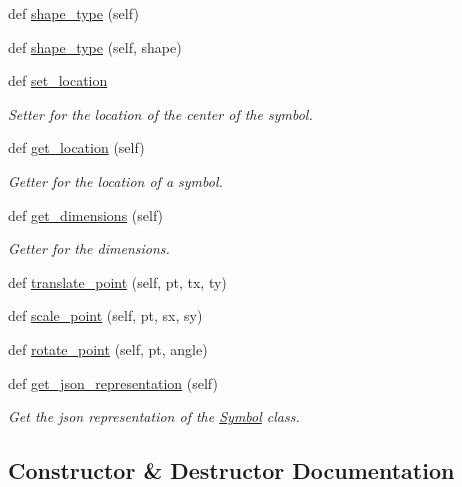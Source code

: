 \begin{DoxyCompactItemize}
def \hyperlink{classbridges_1_1symbol_1_1_symbol_a86813f0f1a7ecbe5c52725730c887e75}{shape\+\_\+type} (self)
\item 
def \hyperlink{classbridges_1_1symbol_1_1_symbol_aea966b54a55c137ec15e849829fc9be9}{shape\+\_\+type} (self, shape)
\item 
def \hyperlink{classbridges_1_1symbol_1_1_symbol_a616aeca9f529ed61300e92e63cbbaf99}{set\+\_\+location}
\begin{DoxyCompactList}\small\item\em Setter for the location of the center of the symbol. \end{DoxyCompactList}\item 
def \hyperlink{classbridges_1_1symbol_1_1_symbol_a8abbc9a5c77eb7e2ef40338102a145c4}{get\+\_\+location} (self)
\begin{DoxyCompactList}\small\item\em Getter for the location of a symbol. \end{DoxyCompactList}\item 
def \hyperlink{classbridges_1_1symbol_1_1_symbol_ae53057317f11148bbbf7c17c671cac2d}{get\+\_\+dimensions} (self)
\begin{DoxyCompactList}\small\item\em Getter for the dimensions. \end{DoxyCompactList}\item 
def \hyperlink{classbridges_1_1symbol_1_1_symbol_a9600a66f48ad38baf42a2043db13334b}{translate\+\_\+point} (self, pt, tx, ty)
\item 
def \hyperlink{classbridges_1_1symbol_1_1_symbol_a963b55370096aa7314b03a2a34da2929}{scale\+\_\+point} (self, pt, sx, sy)
\item 
def \hyperlink{classbridges_1_1symbol_1_1_symbol_a81d55230ba4fec6c9a31d76cfc97bc96}{rotate\+\_\+point} (self, pt, angle)
\item 
def \hyperlink{classbridges_1_1symbol_1_1_symbol_a746f8e6d1fd1c63c8a9140a2af7436f8}{get\+\_\+json\+\_\+representation} (self)
\begin{DoxyCompactList}\small\item\em Get the json representation of the \hyperlink{classbridges_1_1symbol_1_1_symbol}{Symbol} class. \end{DoxyCompactList}\end{DoxyCompactItemize}


\subsection{Constructor \& Destructor Documentation}
\mbox{\label{classbridges_1_1symbol_1_1_symbol_a57c7fcd41baccb9c2e15c9c828d957f6}} 
